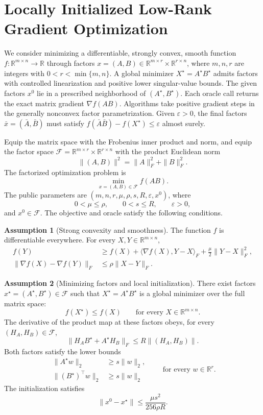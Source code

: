 \documentclass[10pt]{article}
\theoremstyle{definition}
\newtheorem{assumption}{Assumption}
\begin{document}
\section*{Locally Initialized Low-Rank Gradient Optimization}
We consider minimizing a differentiable, strongly convex, smooth function $f:\mathbb{R}^{m\times n}\to\mathbb{R}$ through factors $x=(A,B)\in\mathbb{R}^{m\times r}\times\mathbb{R}^{r\times n}$, where $m,n,r$ are integers with $0<r<\min\{m,n\}$. A global minimizer $X^\star=A^\star B^\star$ admits factors with controlled linearization and positive lower singular-value bounds. The given factors $x^0$ lie in a prescribed neighborhood of $(A^\star,B^\star)$. Each oracle call returns the exact matrix gradient $\nabla f(AB)$. Algorithms take positive gradient steps in the generally nonconvex factor parametrization. Given $\varepsilon>0$, the final factors $\bar{x}=(\bar{A},\bar{B})$ must satisfy $f(\bar{A}\bar{B})-f(X^\star)\leq\varepsilon$ almost surely.

Equip the matrix space with the Frobenius inner product and norm, and equip the factor space $\mathcal{F}=\mathbb{R}^{m\times r}\times\mathbb{R}^{r\times n}$ with the product Euclidean norm
\[
\|(A,B)\|^2=\|A\|_F^2+\|B\|_F^2.
\]
The factorized optimization problem is
\[
\min_{x=(A,B)\in\mathcal{F}} f(AB).
\]
The public parameters are $(m,n,r,\mu,\rho,s,R,\varepsilon,x^0)$, where
\[
0<\mu\leq\rho,\qquad 0<s\leq R,\qquad \varepsilon>0,
\]
and $x^0\in\mathcal{F}$. The objective and oracle satisfy the following conditions.

\begin{assumption}[Strong convexity and smoothness]
The function $f$ is differentiable everywhere. For every $X,Y\in\mathbb{R}^{m\times n}$,
\[
\begin{aligned}
f(Y)&\geq f(X)+\langle\nabla f(X),Y-X\rangle_F
       +\frac{\mu}{2}\|Y-X\|_F^2,\\
\|\nabla f(X)-\nabla f(Y)\|_F
       &\leq\rho\|X-Y\|_F.
\end{aligned}
\]
\end{assumption}

\begin{assumption}[Minimizing factors and local initialization]
There exist factors $x^\star=(A^\star,B^\star)\in\mathcal{F}$ such that $X^\star=A^\star B^\star$ is a global minimizer over the full matrix space:
\[
f(X^\star)\leq f(X)\qquad\text{for every }X\in\mathbb{R}^{m\times n}.
\]
The derivative of the product map at these factors obeys, for every $(H_A,H_B)\in\mathcal{F}$,
\[
\|H_A B^\star+A^\star H_B\|_F
\leq R\|(H_A,H_B)\|.
\]
Both factors satisfy the lower bounds
\[
\begin{aligned}
\|A^\star w\|_2&\geq s\|w\|_2,\\
\|(B^\star)^\top w\|_2&\geq s\|w\|_2
\end{aligned}
\qquad\text{for every }w\in\mathbb{R}^r.
\]
The initialization satisfies
\[
\|x^0-x^\star\|\leq\frac{\mu s^2}{256\rho R}.
\]
\end{assumption}
\end{document}
